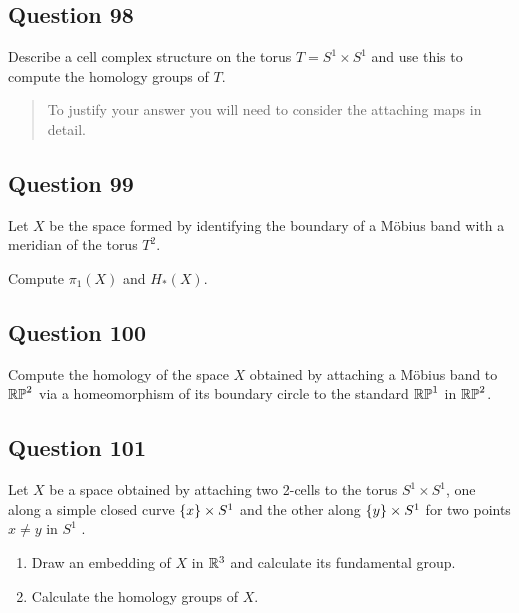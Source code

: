 \documentclass[12pt]{article}
\begin{document}
\hypertarget{question-98-2}{%
\subsection{Question 98}\label{question-98-2}}

Describe a cell complex structure on the torus \(T = S^1 \times S^1\)
and use this to compute the homology groups of \(T\).

\begin{quote}
To justify your answer you will need to consider the attaching maps in
detail.
\end{quote}

\hypertarget{question-99-2}{%
\subsection{Question 99}\label{question-99-2}}

Let \(X\) be the space formed by identifying the boundary of a Möbius
band with a meridian of the torus \(T^2\).

Compute \(\pi_1 (X)\) and \(H_* (X)\).

\hypertarget{question-100-2}{%
\subsection{Question 100}\label{question-100-2}}

Compute the homology of the space \(X\) obtained by attaching a Möbius
band to \({\mathbb{RP}}^2\) via a homeomorphism of its boundary circle to the
standard \({\mathbb{RP}}^1\) in \({\mathbb{RP}}^2\).

\hypertarget{question-101-2}{%
\subsection{Question 101}\label{question-101-2}}

Let \(X\) be a space obtained by attaching two 2-cells to the torus
\(S^1 \times S^1\), one along a simple closed curve
\(\left\{{x}\right\} \times S^1\) and the other along \(\left\{{y}\right\} \times S^1\)
for two points \(x \neq y\) in \(S^1\) .

\begin{enumerate}
\def\labelenumi{\alph{enumi}.}
\item
  Draw an embedding of \(X\) in \({\mathbb{R}}^3\) and calculate its fundamental
  group.
\item
  Calculate the homology groups of \(X\).
\end{enumerate}
\end{document}
